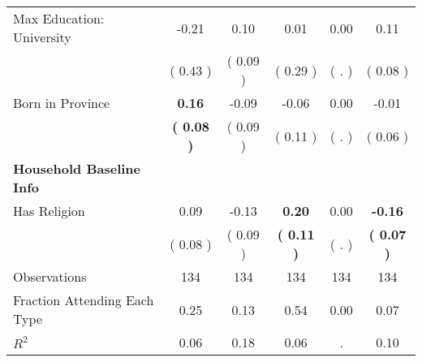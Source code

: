 \begin{table}[H]
{\begin{tabular}{lccccc}
\quad Max Education: University &     -0.21 &      0.10 &      0.01 &      0.00 &      0.11 \\
\quad  & (     0.43 ) & (     0.09 )  & (     0.29 )  & (        . ) & (     0.08 ) \\
\quad Born in Province & \textbf{     0.16} &     -0.09 &     -0.06 &      0.00 &     -0.01 \\
\quad  & \textbf{(     0.08 )} & (     0.09 )  & (     0.11 )  & (        . ) & (     0.06 ) \\
\midrule
\textbf{Household Baseline Info} \\
\quad Has Religion &      0.09 &     -0.13 & \textbf{     0.20} &      0.00 & \textbf{    -0.16} \\
\quad  & (     0.08 ) & (     0.09 )  & \textbf{(     0.11 )}  & (        . ) & \textbf{(     0.07 )} \\
\midrule
Observations & 134 & 134 & 134 & 134 & 134 \\
Fraction Attending Each Type &      0.25 &      0.13 &      0.54 &      0.00 &      0.07 \\
\midrule
$ R^2$ &      0.06 &      0.18 &      0.06 &         . &      0.10 \\
\bottomrule
\end{tabular}}
\end{table}
